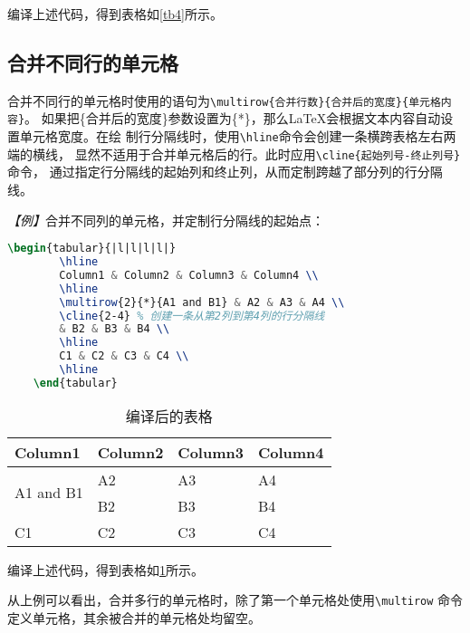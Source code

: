 编译上述代码，得到表格如\ref{tb4}所示。

\subsection{合并不同行的单元格}

合并不同行的单元格时使用的语句为\texttt{\textbackslash{}multirow\{合并行数\}\{合并后的宽度\}\{单元格内容\}}。
如果把\{合并后的宽度\}参数设置为\{*\}，那么LaTeX会根据文本内容自动设置单元格宽度。在绘
制行分隔线时，使用\texttt{\textbackslash{}hline}命令会创建一条横跨表格左右两端的横线，
显然不适用于合并单元格后的行。此时应用\texttt{\textbackslash{}cline\{起始列号-终止列号\}}命令，
通过指定行分隔线的起始列和终止列，从而定制跨越了部分列的行分隔线。

\emph{【例】}合并不同列的单元格，并定制行分隔线的起始点：
\begin{lstlisting}[language=TeX]
    \begin{tabular}{|l|l|l|l|}
        \hline
        Column1 & Column2 & Column3 & Column4 \\
        \hline
        \multirow{2}{*}{A1 and B1} & A2 & A3 & A4 \\
        \cline{2-4} % 创建一条从第2列到第4列的行分隔线
        & B2 & B3 & B4 \\
        \hline
        C1 & C2 & C3 & C4 \\
        \hline
    \end{tabular}
\end{lstlisting}

\begin{table}[h]
    \centering
    \begin{tabular}{|l|l|l|l|}
        \hline
        Column1                    & Column2 & Column3 & Column4 \\
        \hline
        \multirow{2}{*}{A1 and B1} & A2      & A3      & A4      \\
        \cline{2-4} %
                                   & B2      & B3      & B4      \\
        \hline
        C1                         & C2      & C3      & C4      \\
        \hline
    \end{tabular}
    \caption{编译后的表格}
    \label{tb5}
\end{table}

编译上述代码，得到表格如\ref{tb5}所示。

从上例可以看出，合并多行的单元格时，除了第一个单元格处使用\texttt{\textbackslash{}multirow}
命令定义单元格，其余被合并的单元格处均留空。

